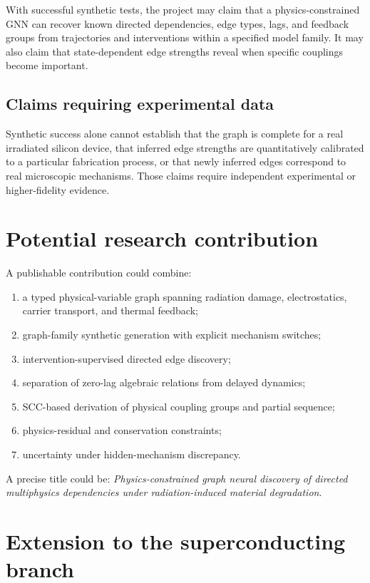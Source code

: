 \documentclass[11pt]{article}
\begin{document}
With successful synthetic tests, the project may claim that a physics-constrained GNN can recover known directed dependencies, edge types, lags, and feedback groups from trajectories and interventions within a specified model family. It may also claim that state-dependent edge strengths reveal when specific couplings become important.

\subsection{Claims requiring experimental data}

Synthetic success alone cannot establish that the graph is complete for a real irradiated silicon device, that inferred edge strengths are quantitatively calibrated to a particular fabrication process, or that newly inferred edges correspond to real microscopic mechanisms. Those claims require independent experimental or higher-fidelity evidence.

\section{Potential research contribution}

A publishable contribution could combine:
\begin{enumerate}[leftmargin=1.6em]
    \item a typed physical-variable graph spanning radiation damage, electrostatics, carrier transport, and thermal feedback;
    \item graph-family synthetic generation with explicit mechanism switches;
    \item intervention-supervised directed edge discovery;
    \item separation of zero-lag algebraic relations from delayed dynamics;
    \item SCC-based derivation of physical coupling groups and partial sequence;
    \item physics-residual and conservation constraints;
    \item uncertainty under hidden-mechanism discrepancy.
\end{enumerate}
A precise title could be: \emph{Physics-constrained graph neural discovery of directed multiphysics dependencies under radiation-induced material degradation}.

\section{Extension to the superconducting branch}
\end{document}
